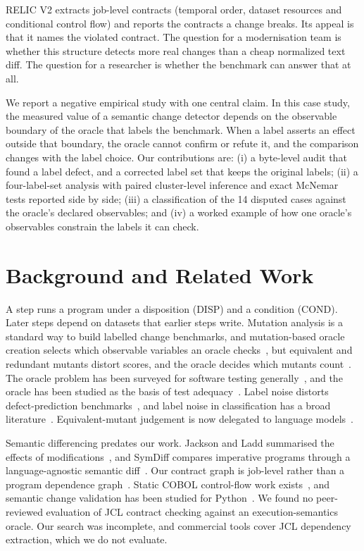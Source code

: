 \documentclass[conference]{IEEEtran}
\begin{document}
RELIC V2 extracts job-level contracts (temporal order, dataset resources and conditional control flow) and reports the contracts a change breaks. Its appeal is that it names the violated contract. The question for a modernisation team is whether this structure detects more real changes than a cheap normalized text diff. The question for a researcher is whether the benchmark can answer that at all.

We report a negative empirical study with one central claim. In this case study, the measured value of a semantic change detector depends on the observable boundary of the oracle that labels the benchmark. When a label asserts an effect outside that boundary, the oracle cannot confirm or refute it, and the comparison changes with the label choice. Our contributions are: (i) a byte-level audit that found a label defect, and a corrected label set that keeps the original labels; (ii) a four-label-set analysis with paired cluster-level inference and exact McNemar tests reported side by side; (iii) a classification of the 14 disputed cases against the oracle's declared observables; and (iv) a worked example of how one oracle's observables constrain the labels it can check.

\section{Background and Related Work}
A step runs a program under a disposition (DISP) and a condition (COND). Later steps depend on datasets that earlier steps write. Mutation analysis is a standard way to build labelled change benchmarks, and mutation-based oracle creation selects which observable variables an oracle checks~\cite{staats2012}, but equivalent and redundant mutants distort scores, and the oracle decides which mutants count~\cite{andrews2005,jia2011,papadakis2016}. The oracle problem has been surveyed for software testing generally~\cite{barr2015}, and the oracle has been studied as the basis of test adequacy~\cite{staats2011}. Label noise distorts defect-prediction benchmarks~\cite{herzig2013}, and label noise in classification has a broad literature~\cite{frenay2014}. Equivalent-mutant judgement is now delegated to language models~\cite{tian2024}.

Semantic differencing predates our work. Jackson and Ladd summarised the effects of modifications~\cite{jackson1994}, and SymDiff compares imperative programs through a language-agnostic semantic diff~\cite{lahiri2012}. Our contract graph is job-level rather than a program dependence graph~\cite{ferrante1987,horwitz1988}. Static COBOL control-flow work exists~\cite{deknop2022}, and semantic change validation has been studied for Python~\cite{changeguard2025}. We found no peer-reviewed evaluation of JCL contract checking against an execution-semantics oracle. Our search was incomplete, and commercial tools cover JCL dependency extraction, which we do not evaluate.
\end{document}
